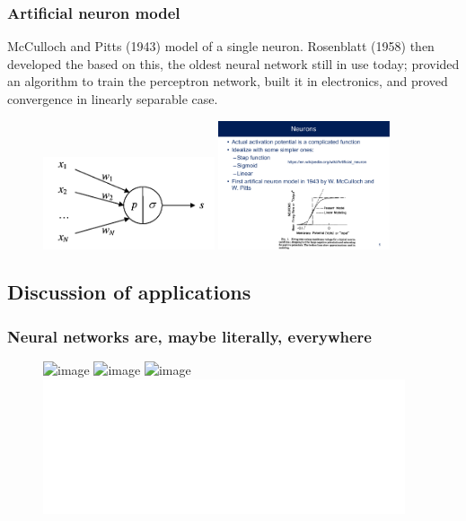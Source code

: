 \documentclass[hyperref={colorlinks=true}]{beamer}
\begin{document}
\begin{frame}%
  \frametitle{Artificial neuron model}

  McCulloch and Pitts (1943) model of a single neuron. Rosenblatt (1958) then developed the  based on this, the oldest neural network still in use today; provided an algorithm to train the perceptron network, built it in electronics, and proved convergence in linearly separable case.
  
  \mysp
    
  \begin{figure}
    \centering
    \includegraphics[width=0.45\textwidth]{The-McCulloch-and-Pitts-1943-model-of-a-single-neuron-Source-Adapted-from-Franck.png}%
    \includegraphics[width=0.45\textwidth]{PittsModel.pdf}%
\end{figure}
    
\end{frame}



\subsection[Discussion of applications]{Discussion of applications}


\begin{frame}%
  \frametitle{Neural networks are, maybe literally, everywhere}

    
  \begin{figure}
    \centering
    \includegraphics<1>[width=0.95\textwidth]{NNs-1.png}%
    \includegraphics<2>[width=0.95\textwidth]{NNs-2.png}%
    \includegraphics<3>[width=0.95\textwidth]{NNs-3.png}%
    \includegraphics<4>[width=0.95\textwidth]{QuarksGluons.pdf}%
\end{figure}
    
\end{frame}
\end{document}
